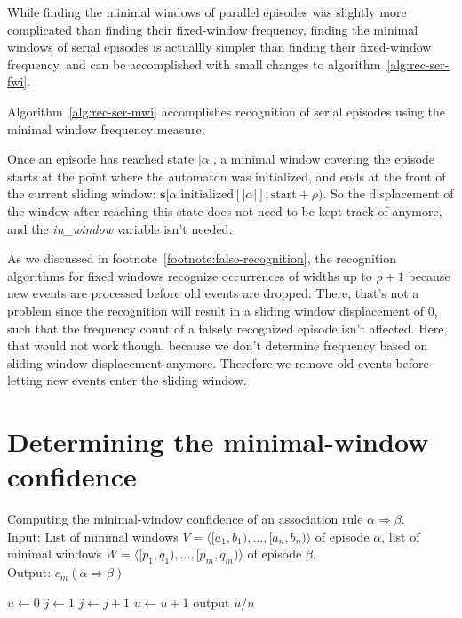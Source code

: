 While finding the minimal windows of parallel episodes was slightly more complicated than finding their fixed-window frequency, finding the minimal windows of serial episodes is actuallly simpler than finding their fixed-window frequency, and can be accomplished with small changes to algorithm~\ref{alg:rec-ser-fwi}.

Algorithm~\ref{alg:rec-ser-mwi} accomplishes recognition of serial episodes using the minimal window frequency measure.

Once an episode has reached state $ | \alpha | $, a minimal window covering the episode starts at the point where the automaton was initialized, and ends at the front of the current sliding window: $ \boldsymbol{s}[\alpha \text{.initialized}[| \alpha |], \text{start} + \rho) $. So the displacement of the window after reaching this state does not need to be kept track of anymore, and the \emph{in\_window} variable isn't needed.

As we discussed in footnote~\ref{footnote:false-recognition}, the recognition algorithms for fixed windows recognize occurrences of widths up to $ \rho + 1 $ because new events are processed before old events are dropped. There, that's not a problem since the recognition will result in a sliding window displacement of $ 0 $, such that the frequency count of a falsely recognized episode isn't affected. Here, that would not work though, because we don't determine frequency based on sliding window displacement anymore. Therefore we remove old events before letting new events enter the sliding window.


\section{Determining the minimal-window confidence}

\begin{algorithm}

\caption{Computing the minimal-window confidence of an association rule $ \alpha \Rightarrow \beta $.\\
Input: List of minimal windows $ V = \langle [a_1, b_1), \ldots, [a_n, b_n) \rangle $ of episode $ \alpha $, list of minimal windows $ W = \langle [p_1, q_1), \ldots, [p_m, q_m) \rangle $ of episode $ \beta $.\\
Output: $ c_m(\alpha \Rightarrow \beta) $
}

\begin{algorithmic}[1]

\State $ u \gets 0 $
\State $ j \gets 1 $
 \label{alglin:minimal-window-confidence:for}
     \label{alglin:minimal-window-confidence:while}
        \State $ j \gets j + 1 $
    \EndWhile
     $ u \gets u + 1 $ \label{alglin:minimal-window-confidence:increment}
    \EndIf
\EndFor
\State output $ u / n $

\end{algorithmic}

\label{alg:minimal-window-confidence}
\end{algorithm}

